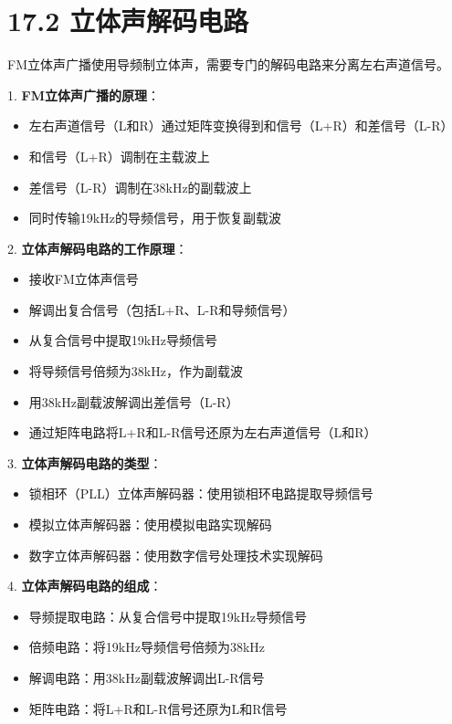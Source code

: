 \documentclass[12pt,UTF8]{ctexbook}
\begin{document}
\section*{17.2 立体声解码电路}

FM立体声广播使用导频制立体声，需要专门的解码电路来分离左右声道信号。

1. \textbf{FM立体声广播的原理}：
   \begin{itemize}[leftmargin=3.5em]
   \item 左右声道信号（L和R）通过矩阵变换得到和信号（L+R）和差信号（L-R）
   \item 和信号（L+R）调制在主载波上
   \item 差信号（L-R）调制在38kHz的副载波上
   \item 同时传输19kHz的导频信号，用于恢复副载波
   \end{itemize}

2. \textbf{立体声解码电路的工作原理}：
   \begin{itemize}[leftmargin=3.5em]
   \item 接收FM立体声信号
   \item 解调出复合信号（包括L+R、L-R和导频信号）
   \item 从复合信号中提取19kHz导频信号
   \item 将导频信号倍频为38kHz，作为副载波
   \item 用38kHz副载波解调出差信号（L-R）
   \item 通过矩阵电路将L+R和L-R信号还原为左右声道信号（L和R）
   \end{itemize}

3. \textbf{立体声解码电路的类型}：
   \begin{itemize}[leftmargin=3.5em]
   \item 锁相环（PLL）立体声解码器：使用锁相环电路提取导频信号
   \item 模拟立体声解码器：使用模拟电路实现解码
   \item 数字立体声解码器：使用数字信号处理技术实现解码
   \end{itemize}

4. \textbf{立体声解码电路的组成}：
   \begin{itemize}[leftmargin=3.5em]
   \item 导频提取电路：从复合信号中提取19kHz导频信号
   \item 倍频电路：将19kHz导频信号倍频为38kHz
   \item 解调电路：用38kHz副载波解调出L-R信号
   \item 矩阵电路：将L+R和L-R信号还原为L和R信号
   \end{itemize}
\end{document}
